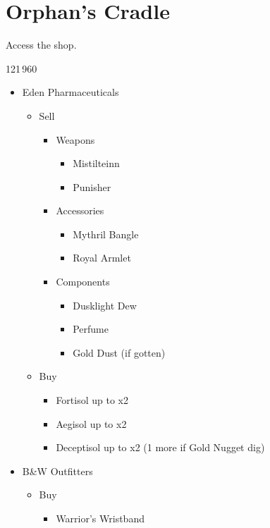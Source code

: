 \chapter{Orphan's Cradle}

Access the shop.

\begin{shop}{121\,960}
	\begin{itemize}
		\item Eden Pharmaceuticals
			\begin{itemize}
				\item Sell
					\begin{itemize}
						\item Weapons
							\begin{itemize}
								\item Mistilteinn
								\item Punisher
							\end{itemize}
						\item Accessories
							\begin{itemize}
								\item Mythril Bangle
								\item Royal Armlet
							\end{itemize}
						\item Components
							\begin{itemize}
								\item Dusklight Dew
								\item Perfume
								\item Gold Dust (if gotten)
							\end{itemize}
					\end{itemize}
				\item Buy
					\begin{itemize}
						\item Fortisol up to x2
						\item Aegisol up to x2
						\item Deceptisol up to x2 (1 more if Gold Nugget dig)
					\end{itemize}
			\end{itemize}
		\item B\&W Outfitters
			\begin{itemize}
				\item Buy
					\begin{itemize}
						\item Warrior's Wristband
					\end{itemize}
			\end{itemize}

\end{itemize}
\end{shop}
